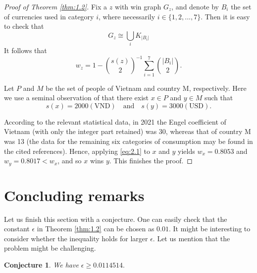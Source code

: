 \documentclass[AER]{AEA}
\DeclareRobustCommand{\AERlink}[1]{}
\newtheorem{conjecture}[theorem]{Conjecture}
\begin{document}
\begin{proof}[Proof of Theorem \ref{thm:1.2}]
Fix a $z$ with win graph $G_{z}$, and denote by $B_{i}$ the set of currencies used in category $i$, where necessarily $i \in \{1, 2, ..., 7\}$. Then it is easy to check that
$$G_{z} \cong \bigcup_{i} K_{|B_{i}|}$$
It follows that
\begin{equation} \label{eq:2.1}
w_{z} = 1 - \binom{s(z)}{2}^{-1} \sum_{i=1}^{7} \binom{|B_{i}|}{2}.
\end{equation}

Let $P$ and $M$ be the set of people of Vietnam and country M, respectively. Here we use a seminal observation of \citet{ChenPing} that there exist $x \in P$ and $y \in M$ such that
$$s(x) = 2000(\text{VND}) \quad \text{and} \quad s(y) = 3000(\text{USD}).$$

According to the relevant statistical data, in 2021 the Engel coefficient of Vietnam (with only the integer part retained) was 30, whereas that of country M was 13 (the data for the remaining six categories of consumption may be found in the cited references). Hence, applying \eqref{eq:2.1} to $x$ and $y$ yields $w_{x} = 0.8053$ and $w_{y} = 0.8017 < w_{x}$, and so $x$ wins $y$. This finishes the proof.
\end{proof}

\section{Concluding remarks}

Let us finish this section with a conjecture. One can easily check that the constant $\epsilon$ in Theorem \ref{thm:1.2} can be chosen as $0.01$. It might be interesting to consider whether the inequality holds for larger $\epsilon$. Let us mention that the problem might be challenging.

\begin{conjecture}
We have $\epsilon \ge 0.0114514.$
\end{conjecture}


\DeclareRobustCommand{\AERlink}[1]{\makebox[0pt][r]{\href{#1}{\color{blue}$\blacktriangleright$}\hspace{0.3em}}}



\end{document}
